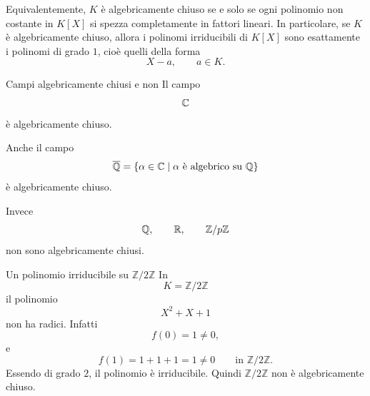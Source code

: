 \documentclass[a4paper]{article}
\begin{document}
\begin{radioactive}
Equivalentemente, \(K\) è algebricamente chiuso se e solo se ogni polinomio non costante in \(K[X]\) si spezza completamente in fattori lineari.
In particolare, se \(K\) è algebricamente chiuso, allora i polinomi irriducibili di \(K[X]\) sono esattamente i polinomi di grado \(1\), cioè quelli della forma
\[
    X-a,
    \qquad
    a\in K.
\]
\end{radioactive}

\begin{radioactive}
\begin{snippetexample}{Campi algebricamente chiusi e non}
    Il campo
    \[
        \mathbb{C}
    \]
    è algebricamente chiuso.

    Anche il campo
    \[
        \overline{\mathbb{Q}}
        =
        \{\alpha\in\mathbb{C}\mid \alpha \text{ è algebrico su } \mathbb{Q}\}
    \]
    è algebricamente chiuso.

    Invece
    \[
        \mathbb{Q},
        \qquad
        \mathbb{R},
        \qquad
        \mathbb{Z}/p\mathbb{Z}
    \]
    non sono algebricamente chiusi.
\end{snippetexample}
\end{radioactive}

\begin{radioactive}
\begin{snippetexample}{Un polinomio irriducibile su \(\mathbb{Z}/2\mathbb{Z}\)}
    In
    \[
        K=\mathbb{Z}/2\mathbb{Z}
    \]
    il polinomio
    \[
        X^2+X+1
    \]
    non ha radici. Infatti
    \[
        f(0)=1\neq 0,
    \]
    e
    \[
        f(1)=1+1+1=1\neq 0
        \qquad
        \text{in } \mathbb{Z}/2\mathbb{Z}.
    \]
    Essendo di grado \(2\), il polinomio è irriducibile.
    Quindi \(\mathbb{Z}/2\mathbb{Z}\) non è algebricamente chiuso.
\end{snippetexample}
\end{radioactive}
\end{document}
